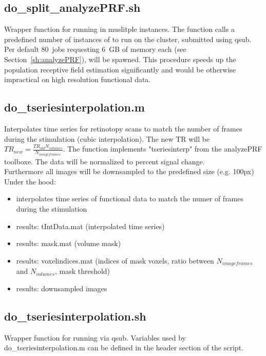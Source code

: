 \documentclass[12pt,a4paper]{scrartcl}
\begin{document}
\subsection{do\_split\_analyzePRF.sh}
\label{sh:splitanalyzePRF}
Wrapper function for running \texttt{} in muslitple instances. The function calls a predefined number of instances of \texttt{} to run on the cluster, submitted using qsub. Per default 80~jobs requesting 6~GB of memory each (see Section~\ref{sh:analyzePRF}), will be spawned. This procedure speeds up the population receptive field estimation significantly and would be otherwise impractical on high resolution functional data.\\

\subsection{do\_tseriesinterpolation.m}
\label{m:tseriesinterp}
Interpolates time series for retinotopy scans to match the number of frames during the stimulation (cubic interpolation). The new TR will be $TR_{new}=\frac{TR_{old}N_{volumes}}{N_{imageframes}}$. The function implements "tseriesinterp" from the analyzePRF toolboxe. The data will be normalized to percent signal change.\\

\noindent Furthermore all images will be downsampled to the predefined size (e.g. 100px)\\

\noindent Under the hood:
\begin{itemize}
\item interpolates time series of functional data to match the numer of frames during the stimulation
\item results: tIntData.mat (interpolated time series)
\item results: mask.mat (volume mask)
\item results: voxelindices.mat (indices of mask voxels, ratio between $N_{imageframes}$ and $N_{volumes}$, mask threshold)
\item results: downsampled images
\end{itemize}

\subsection{do\_tseriesinterpolation.sh}
\label{sh:tseriesinterp}
Wrapper function for running \texttt{} via qsub. Variables used by do\_tseriesinterpolation.m can be defined in the header section of the script.
\end{document}
